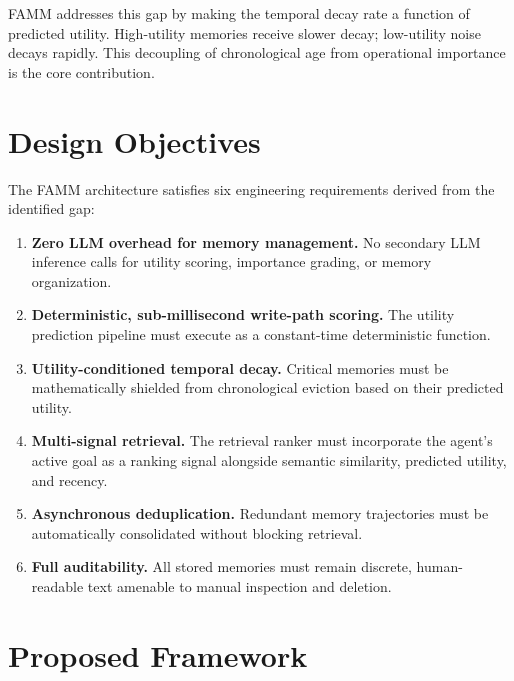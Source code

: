 \documentclass[conference]{IEEEtran}
\begin{document}
FAMM addresses this gap by making the temporal decay rate a function of predicted utility. High-utility memories receive slower decay; low-utility noise decays rapidly. This decoupling of chronological age from operational importance is the core contribution.

\section{Design Objectives}
\label{sec:objectives}

The FAMM architecture satisfies six engineering requirements derived from the identified gap:

\begin{enumerate}[label=\textbf{O\arabic*.}, leftmargin=*]
    \item \textbf{Zero LLM overhead for memory management.} No secondary LLM inference calls for utility scoring, importance grading, or memory organization.
    \item \textbf{Deterministic, sub-millisecond write-path scoring.} The utility prediction pipeline must execute as a constant-time deterministic function.
    \item \textbf{Utility-conditioned temporal decay.} Critical memories must be mathematically shielded from chronological eviction based on their predicted utility.
    \item \textbf{Multi-signal retrieval.} The retrieval ranker must incorporate the agent's active goal as a ranking signal alongside semantic similarity, predicted utility, and recency.
    \item \textbf{Asynchronous deduplication.} Redundant memory trajectories must be automatically consolidated without blocking retrieval.
    \item \textbf{Full auditability.} All stored memories must remain discrete, human-readable text amenable to manual inspection and deletion.
\end{enumerate}

\section{Proposed Framework}
\label{sec:framework}
\end{document}
